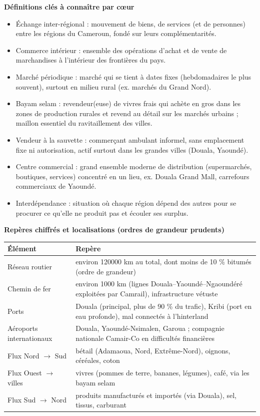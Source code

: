 \documentclass[11pt]{article}
\newcommand{\cle}[1]{{\popxbold\color{popdark}#1}}
\begin{document}
\begin{bilan}
\textbf{Définitions clés à connaître par cœur}
\begin{itemize}
  \item \cle{Échange inter-régional} : mouvement de biens, de services (et de personnes) entre les régions du Cameroun, fondé sur leurs complémentarités.
  \item \cle{Commerce intérieur} : ensemble des opérations d'achat et de vente de marchandises à l'intérieur des frontières du pays.
  \item \cle{Marché périodique} : marché qui se tient à dates fixes (hebdomadaires le plus souvent), surtout en milieu rural (ex. marchés du Grand Nord).
  \item \cle{Bayam selam} : revendeur(euse) de vivres frais qui achète en gros dans les zones de production rurales et revend au détail sur les marchés urbains ; maillon essentiel du ravitaillement des villes.
  \item \cle{Vendeur à la sauvette} : commerçant ambulant informel, sans emplacement fixe ni autorisation, actif surtout dans les grandes villes (Douala, Yaoundé).
  \item \cle{Centre commercial} : grand ensemble moderne de distribution (supermarchés, boutiques, services) concentré en un lieu, ex. Douala Grand Mall, carrefours commerciaux de Yaoundé.
  \item \cle{Interdépendance} : situation où chaque région dépend des autres pour se procurer ce qu'elle ne produit pas et écouler ses surplus.
\end{itemize}

\textbf{Repères chiffrés et localisations (ordres de grandeur prudents)}
\begin{center}
\begin{tabularx}{\linewidth}{|l|X|}\hline
\rowcolor{popblueL} \textbf{Élément} & \textbf{Repère} \\ \hline
Réseau routier & environ \num{120000} km au total, dont moins de 10 \% bitumés (ordre de grandeur) \\ \hline
Chemin de fer & environ \num{1000} km (lignes Douala--Yaoundé--Ngaoundéré exploitées par Camrail), infrastructure vétuste \\ \hline
Ports & Douala (principal, plus de 90 \% du trafic), Kribi (port en eau profonde), mal connectés à l'hinterland \\ \hline
Aéroports internationaux & Douala, Yaoundé-Nsimalen, Garoua ; compagnie nationale Camair-Co en difficultés financières \\ \hline
Flux Nord $\rightarrow$ Sud & bétail (Adamaoua, Nord, Extrême-Nord), oignons, céréales, coton \\ \hline
Flux Ouest $\rightarrow$ villes & vivres (pommes de terre, bananes, légumes), café, via les bayam selam \\ \hline
Flux Sud $\rightarrow$ Nord & produits manufacturés et importés (via Douala), sel, tissus, carburant \\ \hline
\end{tabularx}
\end{center}


\end{bilan}
\end{document}

